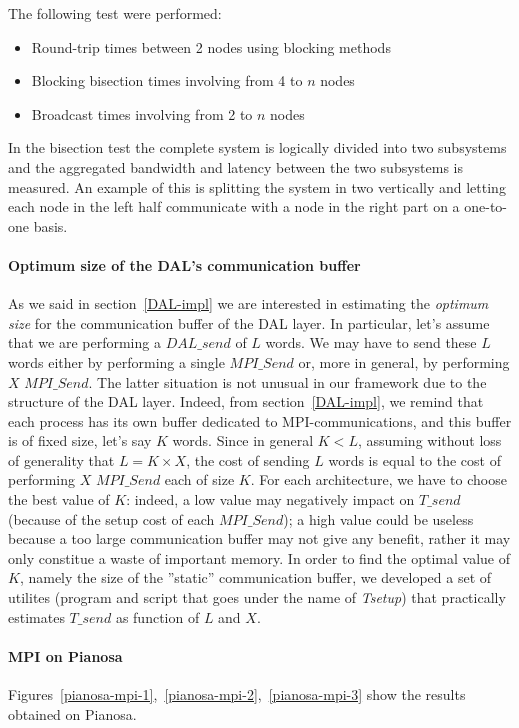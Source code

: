 The following test were performed:
\begin{itemize}
	\item Round-trip times between 2 nodes using blocking methods
	\item Blocking bisection times involving from 4 to $n$ nodes
	\item Broadcast times involving from 2 to $n$ nodes
\end{itemize}
In the bisection test the complete system is logically divided into two subsystems and the aggregated bandwidth and latency between the two subsystems is measured. An example of this is splitting the system in two vertically and letting each node in the left half communicate with a node in the right part on a one-to-one basis.

\paragraph{Optimum size of the DAL's communication buffer}
As we said in section~\ref{DAL-impl} we are interested in estimating the \textit{optimum size} for the communication buffer of the DAL layer. In particular, let's assume that we are performing a $DAL\_send$ of $L$ words. We may have to send these $L$ words either by performing a single $MPI\_Send$ or, more in general, by performing $X$ $MPI\_Send$. The latter situation is not unusual in our framework due to the structure of the DAL layer. Indeed, from section~\ref{DAL-impl}, we remind that each process has its own buffer dedicated to MPI-communications, and this buffer is of fixed size, let's say $K$ words. Since in general $K < L$, assuming without loss of generality that $L = K \times X$, the cost of sending $L$ words is equal to the cost of performing $X$ $MPI\_Send$ each of size $K$. For each architecture, we have to choose the best value of $K$: indeed, a low value may negatively impact on $T\_send$ (because of the setup cost of each $MPI\_Send$); a high value could be useless because a too large communication buffer may not give any benefit, rather it may only constitue a waste of important memory. In order to find the optimal value of $K$, namely the size of the ''static'' communication buffer, we developed a set of utilites (program and script that goes under the name of \textit{Tsetup}) that practically estimates $T\_send$ as function of $L$ and $X$. 

\paragraph{MPI on Pianosa}
\label{test-env-pianosa}
Figures~\ref{pianosa-mpi-1},~\ref{pianosa-mpi-2},~\ref{pianosa-mpi-3} show the results obtained on Pianosa.

